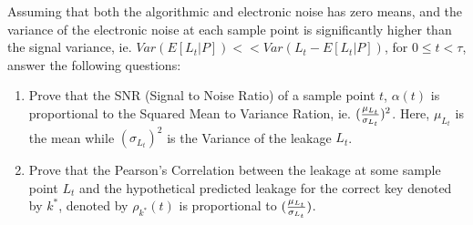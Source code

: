 \documentclass{article}
\begin{document}
\begin{questions}
Assuming that both the algorithmic and electronic noise has zero means, and 
the variance of the electronic noise at each sample point 
is significantly higher than the signal variance, ie. 
$Var(E[L_t|P]) << Var(L_t-E[L_t|P])$, for $0 \leq t < \tau$, 
answer the following questions:
\begin{enumerate}
\item Prove that the SNR (Signal to Noise Ratio) of a sample 
point $t$, $\alpha(t)$ is proportional to the 
Squared Mean to Variance Ration, ie. $({\mu_{L_t} \over \sigma_{L_t}})^2$. 
Here, $\mu_{L_t}$ is the mean while $(\sigma_{L_t})^2$ is the Variance 
of the leakage $L_t$. 

\item Prove that the Pearson's Correlation between the leakage 
at some sample point $L_t$ and the hypothetical predicted leakage for the 
correct key denoted by $k^*$, denoted by $\rho_{k^*}(t)$ is 
proportional to $({\mu_{L_t} \over \sigma_{L_t}})$. 
\end{enumerate}


\end{questions}
\end{document}
